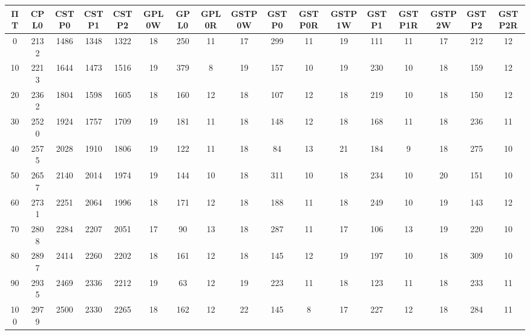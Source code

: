 \begin{tabular}{|c|c|c|c|c|c|c|c|c|c|c|c|c|c|c|c|c|}
\hline
ΠΤ&CPL0&CSTP0&CSTP1&CSTP2&GPL0W&GPL0&GPL0R&GSTP0W&GSTP0&GSTP0R&GSTP1W&GSTP1&GSTP1R&GSTP2W&GSTP2&GSTP2R\\\hline
\hline
0&2132&1486&1348&1322&18&250&11&17&299&11&19&111&11&17&212&12\\
\hline
10&2213&1644&1473&1516&19&379&8&19&157&10&19&230&10&18&159&12\\
\hline
20&2362&1804&1598&1605&18&160&12&18&107&12&18&219&10&18&150&12\\
\hline
30&2520&1924&1757&1709&19&181&11&18&148&12&18&168&11&18&236&11\\
\hline
40&2575&2028&1910&1806&19&122&11&18&84&13&21&184&9&18&275&10\\
\hline
50&2657&2140&2014&1974&19&144&10&18&311&10&18&234&10&20&151&10\\
\hline
60&2731&2251&2064&1996&18&171&12&18&188&11&18&249&10&19&143&12\\
\hline
70&2808&2284&2207&2051&17&90&13&18&287&11&17&106&13&19&220&10\\
\hline
80&2897&2414&2260&2202&18&161&12&18&145&12&19&197&10&18&309&10\\
\hline
90&2935&2469&2336&2212&19&63&12&19&223&11&18&123&11&18&233&11\\
\hline
100&2979&2500&2330&2265&18&162&12&22&145&8&17&227&12&18&284&11\\
\hline
\end{tabular}
